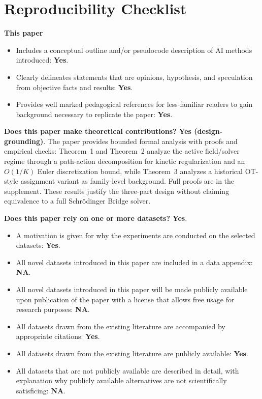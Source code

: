 \documentclass[letterpaper]{article}
\begin{document}
\small
\setlength{\itemsep}{1pt}
\setlength{\parskip}{2pt}
\section*{Reproducibility Checklist}
\noindent\textbf{This paper}
\begin{itemize}
\item Includes a conceptual outline and/or pseudocode description of AI methods introduced: \textbf{Yes}.
\item Clearly delineates statements that are opinions, hypothesis, and speculation from objective facts and results: \textbf{Yes}.
\item Provides well marked pedagogical references for less-familiar readers to gain background necessary to replicate the paper: \textbf{Yes}.
\end{itemize}

\noindent\textbf{Does this paper make theoretical contributions?} \textbf{Yes (design-grounding)}. The paper provides bounded formal analysis with proofs and empirical checks: Theorem~1 and Theorem~2 analyze the active field/solver regime through a path-action decomposition for kinetic regularization and an $O(1/K)$ Euler discretization bound, while Theorem~3 analyzes a historical OT-style assignment variant as family-level background. Full proofs are in the supplement. These results justify the three-part design without claiming equivalence to a full Schr\"odinger Bridge solver.

\noindent\textbf{Does this paper rely on one or more datasets?} \textbf{Yes}.
\begin{itemize}
\item A motivation is given for why the experiments are conducted on the selected datasets: \textbf{Yes}.
\item All novel datasets introduced in this paper are included in a data appendix: \textbf{NA}.
\item All novel datasets introduced in this paper will be made publicly available upon publication of the paper with a license that allows free usage for research purposes: \textbf{NA}.
\item All datasets drawn from the existing literature are accompanied by appropriate citations: \textbf{Yes}.
\item All datasets drawn from the existing literature are publicly available: \textbf{Yes}.
\item All datasets that are not publicly available are described in detail, with explanation why publicly available alternatives are not scientifically satisficing: \textbf{NA}.
\end{itemize}
\end{document}
